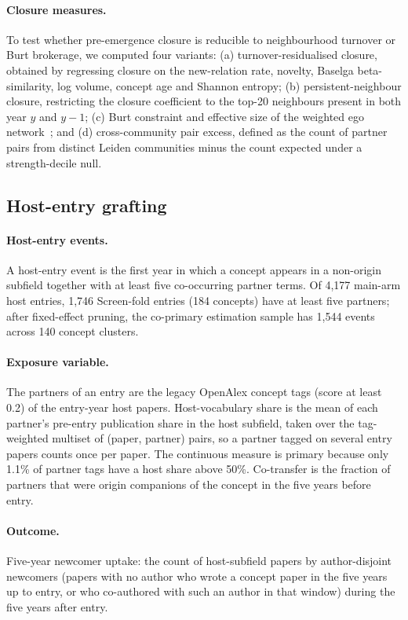 \documentclass[11pt,letterpaper]{article}
\begin{document}
\paragraph{Closure measures.} To test whether pre-emergence closure is reducible to neighbourhood turnover
or Burt brokerage, we computed four variants: (a) turnover-residualised closure, obtained by regressing
closure on the new-relation rate, novelty, Baselga beta-similarity, log volume, concept age and Shannon
entropy; (b) persistent-neighbour closure, restricting the closure coefficient to the top-20 neighbours
present in both year $y$ and $y{-}1$; (c) Burt constraint and effective size of the weighted ego
network~\citep{Burt2004}; and (d) cross-community pair excess, defined as the count of partner pairs from
distinct Leiden communities minus the count expected under a strength-decile null.

\subsection{Host-entry grafting}
\label{sec:rq2method}

\paragraph{Host-entry events.} A host-entry event is the first year in which a concept appears in a
non-origin subfield together with at least five co-occurring partner terms. Of 4,177 main-arm host entries, 1,746 Screen-fold
entries (184 concepts) have at least five partners; after fixed-effect pruning, the co-primary estimation sample has
1,544 events across 140 concept clusters.

\paragraph{Exposure variable.} The partners of an entry are the legacy OpenAlex concept tags (score at least 0.2)
of the entry-year host papers. Host-vocabulary share is the mean of each partner's pre-entry publication share in
the host subfield, taken over the tag-weighted multiset of (paper, partner) pairs, so a partner tagged on several
entry papers counts once per paper. The continuous measure is primary because only 1.1\% of partner tags have a host
share above 50\%. Co-transfer is the fraction of partners that were origin companions of the concept in the
five years before entry.

\paragraph{Outcome.} Five-year newcomer uptake: the count of host-subfield papers by author-disjoint newcomers
(papers with no author who wrote a concept paper in the five years up to entry, or who co-authored with such
an author in that window) during the five years after entry.
\end{document}
